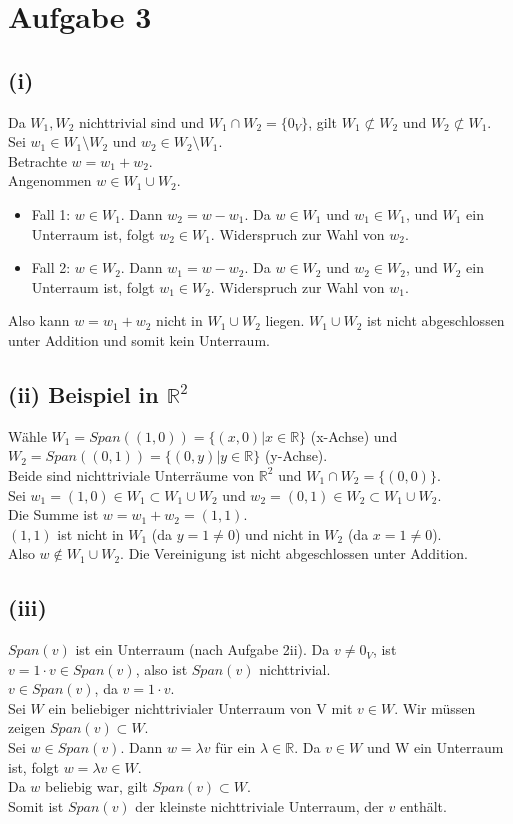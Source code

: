 \documentclass{article}
\begin{document}
\section*{Aufgabe 3}

\subsection*{(i)}
Da $W_1, W_2$ nichttrivial sind und $W_1 \cap W_2 = \{0_V\}$, gilt $W_1 \not\subset W_2$ und $W_2 \not\subset W_1$. Sei $w_1 \in W_1 \setminus W_2$ und $w_2 \in W_2 \setminus W_1$.  \\
Betrachte $w = w_1 + w_2$. \\
Angenommen $w \in W_1 \cup W_2$.
\begin{itemize}
    \item Fall 1: $w \in W_1$. Dann $w_2 = w - w_1$. Da $w \in W_1$ und $w_1 \in W_1$, und $W_1$ ein Unterraum ist, folgt $w_2 \in W_1$. Widerspruch zur Wahl von $w_2$.
    \item Fall 2: $w \in W_2$. Dann $w_1 = w - w_2$. Da $w \in W_2$ und $w_2 \in W_2$, und $W_2$ ein Unterraum ist, folgt $w_1 \in W_2$. Widerspruch zur Wahl von $w_1$.
\end{itemize}
Also kann $w = w_1 + w_2$ nicht in $W_1 \cup W_2$ liegen. $W_1 \cup W_2$ ist nicht abgeschlossen unter Addition und somit kein Unterraum.

\subsection*{(ii) Beispiel in $\mathbb{R}^2$}
Wähle $W_1 = Span((1,0)) = \{(x,0) | x \in \mathbb{R}\}$ (x-Achse) und $W_2 = Span((0,1)) = \{(0,y) | y \in \mathbb{R}\}$ (y-Achse). \\
Beide sind nichttriviale Unterräume von $\mathbb{R}^2$ und $W_1 \cap W_2 = \{(0,0)\}$. \\
Sei $w_1 = (1,0) \in W_1 \subset W_1 \cup W_2$ und $w_2 = (0,1) \in W_2 \subset W_1 \cup W_2$. \\
Die Summe ist $w = w_1 + w_2 = (1,1)$. \\
$(1,1)$ ist nicht in $W_1$ (da $y=1 \neq 0$) und nicht in $W_2$ (da $x=1 \neq 0$). \\
Also $w \notin W_1 \cup W_2$. Die Vereinigung ist nicht abgeschlossen unter Addition.

\subsection*{(iii)}

$Span(v)$ ist ein Unterraum (nach Aufgabe 2ii). Da $v \neq 0_V$, ist $v = 1 \cdot v \in Span(v)$, also ist $Span(v)$ nichttrivial. \\
$v \in Span(v)$, da $v = 1 \cdot v$. \\
Sei $W$ ein beliebiger nichttrivialer Unterraum von V mit $v \in W$. Wir müssen zeigen $Span(v) \subset W$. \\
Sei $w \in Span(v)$. Dann $w = \lambda v$ für ein $\lambda \in \mathbb{R}$. Da $v \in W$ und W ein Unterraum ist, folgt $w = \lambda v \in W$. \\
Da $w$ beliebig war, gilt $Span(v) \subset W$. \\
Somit ist $Span(v)$ der kleinste nichttriviale Unterraum, der $v$ enthält.
\end{document}
